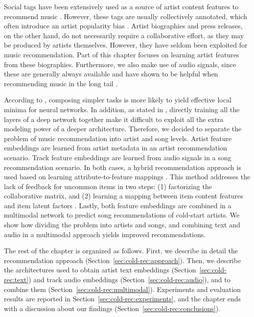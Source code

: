 Social tags have been extensively used as a source of artist content features to recommend music \cite{Knees2013}. However, these tags are usually collectively annotated, which often introduce an artist popularity bias \cite{Turnbull2008}.
Artist biographies and press releases, on the other hand, do not necessarily require a collaborative effort, as they may be produced by artists themselves. 
However, they have seldom been exploited for music recommendation.
Part of this chapter focuses on learning artist features from these biographies.
Furthermore, we also make use of audio signals, since these are generally always available and have shown to be helpful when recommending music in the long tail \cite{Oord2013}.

According to \cite{gulccehre2016knowledge}, composing simpler tasks is more likely to yield effective local minima for neural networks. In addition, as stated in \cite{larochelle2009exploring}, directly training all the layers of a deep network together make it difficult to exploit all the extra modeling power of a deeper architecture. 
Therefore, we decided to separate the problem of music recommendation into artist and song levels.
Artist feature embeddings are learned from artist metadata in an artist recommendation scenario.
Track feature embeddings are learned from audio signals in a song recommendation scenario.
In both cases, a hybrid recommendation approach is used based on learning attribute-to-feature mappings \cite{GantnerDFRS10}.
This method addresses the lack of feedback for uncommon items in two steps: (1) factorizing the collaborative matrix, and (2) learning a mapping between item content features and item latent factors \cite{Oord2013,Bansal2016}.
Lastly, both feature embeddings are combined in a multimodal network to predict song recommendations of cold-start artists.
We show how dividing the problem into artists and songs, and combining text and audio in a multimodal approach yields improved recommendations.

The rest of the chapter is organized as follows. First, we describe in detail the recommendation approach (Section~\ref{sec:cold-rec:approach}). Then, we describe the architectures used to obtain artist text embeddings (Section~\ref{sec:cold-rec:text}) and track audio embeddings (Section~\ref{sec:cold-rec:audio}), and to combine them (Section~\ref{sec:cold-rec:multimodal}). Experiments and evaluation results are reported in Section~\ref{sec:cold-rec:experiments}, and the chapter ends with a discussion about our findings (Section~\ref{sec:cold-rec:conclusions}).


